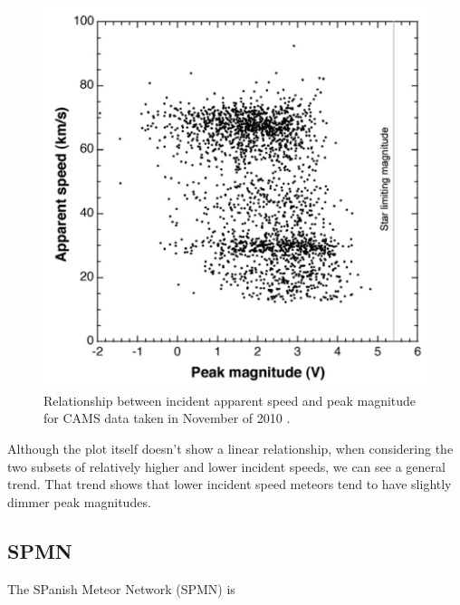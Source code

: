 \begin{figure}[ht!]
  \centering
  \includegraphics[scale=0.6]{images/CAMS_plot.png}
  \caption{Relationship between incident apparent speed and peak magnitude for CAMS data taken in November of 2010 \cite{jenniskens_cams:_2011}.}
  \label{fancyCAMS}
\end{figure}


Although the plot itself doesn't show a linear relationship, when considering the two subsets of relatively higher and lower incident speeds, we can see a general trend.
That trend shows that lower incident speed meteors tend to have slightly dimmer peak magnitudes. 



\subsection{SPMN}

The SPanish Meteor Network (SPMN) is 
